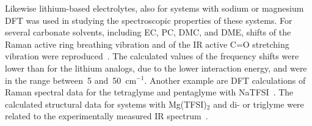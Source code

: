 Likewise lithium-based electrolytes, also for systems with sodium or magnesium DFT was used in studying the spectroscopic properties of these systems. For several carbonate solvents, including EC, PC, DMC, and DME, shifts of the Raman active ring breathing vibration and of the IR active C=O stretching vibration were reproduced~\cite{na-dft-9,vibrational-exp-3,na-dft-11}. The calculated values of the frequency shifts were lower than for the lithium analogs, due to the lower interaction energy, and were in the range between~5 and~50~cm$^{-1}$. Another example are DFT calculations of Raman spectral data for the tetraglyme and pentaglyme with NaTFSI~\cite{na-dft-12}. The calculated structural data for systems with Mg(TFSI)$_2$ and di- or triglyme were related to the experimentally measured IR spectrum~\cite{mg-dft-4}.

